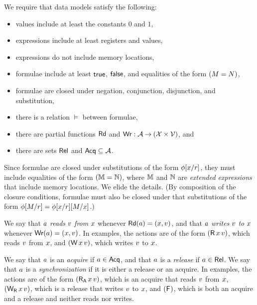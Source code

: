 We require that data models satisfy the following:
\begin{itemize}
\item values include at least the constants $0$ and $1$,
\item expressions include at least registers and values,
\item expressions do not include memory locations,
\item formulae include at least $\mathsf{true}$, $\mathsf{false}$, and equalities of the form $(M=N)$,
\item formulae are closed under negation, conjunction, disjunction, and
  substitution, 
\item there is a relation $\vDash$ between formulae, 
\item there are partial functions $\mathsf{Rd}$ and $\mathsf{Wr}: \mathcal{A} \mathbin\rightarrow (\mathcal{X}
  \times \mathcal{V})$, and
\item there are sets $\mathsf{Rel}$ and $\mathsf{Acq} \subseteq\mathcal{A}$.
\end{itemize}
Since formulae are closed under substitutions of the form
$\phi[x/r]$, they must include equalities of the form
$(\mathbb{M}=\mathbb{N})$, where $\mathbb{M}$ and $\mathbb{N}$ are \emph{extended
  expressions} that include memory locations.  We elide the details.
(By composition of the closure conditions, formulae must also be closed
under that substitutions of the form $\phi[M/r]=\phi[x/r][M/x]$.)

We say that $a$ \emph{reads} $v$ \emph{from} $x$ whenever
$\mathsf{Rd}(a) = (x,v)$, and that $a$ \emph{writes} $v$
\emph{to} $x$ whenever $\mathsf{Wr}(a) = (x,v)$.  In examples,
the actions are of the form $(\DR{\aLoc}{\aVal})$, which reads $v$ from
$x$, and $(\DW{\aLoc}{\aVal})$, which writes $v$ to $x$.

We say that $a$ is an \emph{acquire} if $a\in\mathsf{Acq}$, and that $a$
is a \emph{release} if $a\in\mathsf{Rel}$.  We say that $a$ is a
\emph{synchronization} if it is either a release or an acquire.  In examples,
the actions are of the form $(\DRAcq{\aLoc}{\aVal})$, which is an acquire
that reads $v$ from $x$, $(\DWRel{\aLoc}{\aVal})$, which is a release
that writes $v$ to $x$, and $(\mathsf{F}_{})$, which is both an acquire and a
release and neither reads nor writes.

